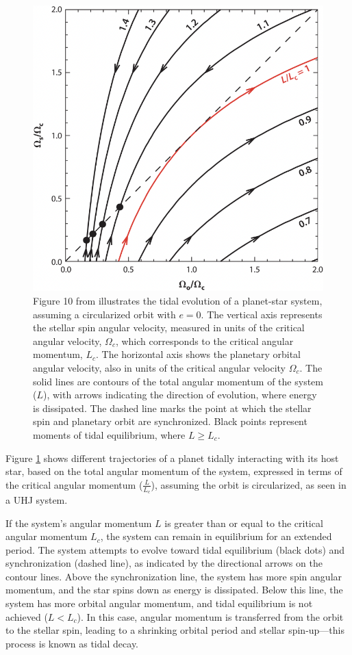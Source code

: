 \documentclass[oneside,12pt]{amsart}
\numberwithin{page}{section}
\begin{document}
\begin{figure}[htbp]
    \centering
    \includegraphics[width=0.8\linewidth]{figs/ogilvie_fig10.png}
    \caption{Figure 10 from \citet{ogilvie2014tidal} illustrates the tidal evolution of a planet-star system, assuming a circularized orbit with $e=0$. The vertical axis represents the stellar spin angular velocity, measured in units of the critical angular velocity, $\Omega_c$, which corresponds to the critical angular momentum, $L_c$. The horizontal axis shows the planetary orbital angular velocity, also in units of the critical angular velocity $\Omega_c$. The solid lines are contours of the total angular momentum of the system ($L$), with arrows indicating the direction of evolution, where energy is dissipated. The dashed line marks the point at which the stellar spin and planetary orbit are synchronized. Black points represent moments of tidal equilibrium, where $L \geq L_c$.}
    \label{fig:ogilvie-fig10}
\end{figure}

Figure \ref{fig:ogilvie-fig10} shows different trajectories of a planet tidally interacting with its host star, based on the total angular momentum of the system, expressed in terms of the critical angular momentum ($\frac{L}{L_c}$), assuming the orbit is circularized, as seen in a UHJ system.

If the system's angular momentum $L$ is greater than or equal to the critical angular momentum $L_c$, the system can remain in equilibrium for an extended period. The system attempts to evolve toward tidal equilibrium (black dots) and synchronization (dashed line), as indicated by the directional arrows on the contour lines. Above the synchronization line, the system has more spin angular momentum, and the star spins down as energy is dissipated. Below this line, the system has more orbital angular momentum, and tidal equilibrium is not achieved ($L < L_c$). In this case, angular momentum is transferred from the orbit to the stellar spin, leading to a shrinking orbital period and stellar spin-up—this process is known as tidal decay.
\end{document}
